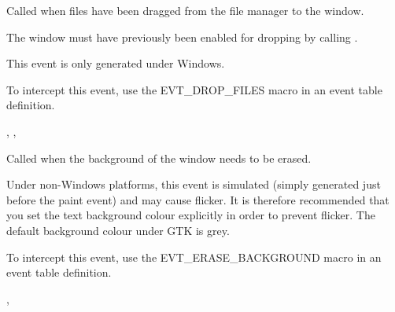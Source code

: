 \label{wxwindowondropfiles}


Called when files have been dragged from the file manager to the window.




The window must have previously been enabled for dropping by calling
\rtfsp{}.

This event is only generated under Windows.

To intercept this event, use the EVT\_DROP\_FILES macro in an event table definition.


, ,\rtfsp
{}

\label{wxwindowonerasebackground}


Called when the background of the window needs to be erased.




Under non-Windows platforms, this event is simulated (simply generated just before the
paint event) and may cause flicker. It is therefore recommended that
you set the text background colour explicitly in order to prevent flicker.
The default background colour under GTK is grey.

To intercept this event, use the EVT\_ERASE\_BACKGROUND macro in an event table definition.


, 

\label{wxwindowonkeydown}

